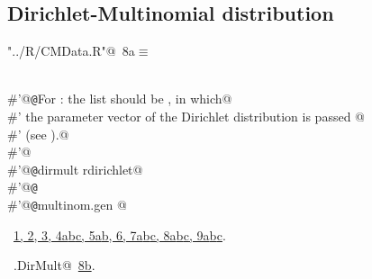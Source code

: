 \documentclass[reqno]{amsart}
\renewcommand{\NWtarget}[2]{\hypertarget{#1}{#2}}
\renewcommand{\NWlink}[2]{\hyperlink{#1}{#2}}
\begin{document}
\subsection{Dirichlet-Multinomial distribution}
\begin{flushleft} \small\label{scrap13}\raggedright\small
\NWtarget{nuweb8a}{} \verb@"../R/CMData.R"@\nobreak\ {\footnotesize {8a}}$\equiv$
\vspace{-1ex}
\begin{list}{}{} \item
\mbox{}\verb@@\\
\mbox{}\verb@#'@{\tt @}\verb@details For : the  list should be , in which@\\
\mbox{}\verb@#' the parameter vector of the Dirichlet distribution is passed @\\
\mbox{}\verb@#' (see ).@\\
\mbox{}\verb@#'@\\
\mbox{}\verb@#'@{\tt @}\verb@importFrom dirmult rdirichlet@\\
\mbox{}\verb@#'@{\tt @}\verb@export@\\
\mbox{}\verb@#'@{\tt @}\verb@rdname multinom.gen @\\
\mbox{}\verb@@{\NWsep}
\end{list}
\vspace{-1.5ex}
\footnotesize
\begin{list}{}{\setlength{\itemsep}{-\parsep}\setlength{\itemindent}{-\leftmargin}}
\item \NWtxtFileDefBy\ \NWlink{nuweb1}{1}\NWlink{nuweb2}{, 2}\NWlink{nuweb3}{, 3}\NWlink{nuweb4a}{, 4a}\NWlink{nuweb4b}{b}\NWlink{nuweb4c}{c}\NWlink{nuweb5a}{, 5a}\NWlink{nuweb5b}{b}\NWlink{nuweb6}{, 6}\NWlink{nuweb7a}{, 7a}\NWlink{nuweb7b}{b}\NWlink{nuweb7c}{c}\NWlink{nuweb8a}{, 8a}\NWlink{nuweb8b}{b}\NWlink{nuweb8c}{c}\NWlink{nuweb9a}{, 9a}\NWlink{nuweb9b}{b}\NWlink{nuweb9c}{c}.
\item \NWtxtIdentsUsed\nobreak\  \verb@mg.DirMult@\nobreak\ \NWlink{nuweb8b}{8b}.
\item{}
\end{list}
\vspace{4ex}
\end{flushleft}
\end{document}
